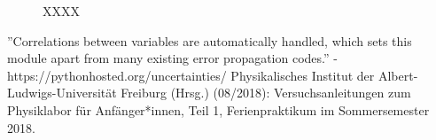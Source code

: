 \documentclass[11pt,a4paper]{article}
\begin{document}
\begin{figure}[p]
\centering
{}
\renewcommand\thefigure{BX}
\caption[XXXX]{XXXX}
\label{Abb:X}
\end{figure}

\begin{thebibliography}{9}
''Correlations between variables are automatically handled, which sets this module apart from many existing error propagation codes.'' - https://pythonhosted.org/uncertainties/
 Physikalisches Institut der Albert-Ludwigs-Universität Freiburg (Hrsg.) (08/2018): Versuchsanleitungen zum Physiklabor für Anfänger*innen, Teil 1, Ferienpraktikum im Sommersemester 2018.
\end{thebibliography}
\end{document}
